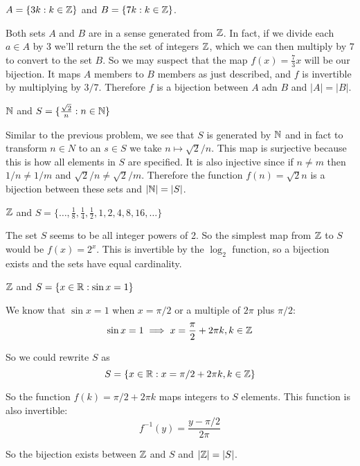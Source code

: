 \documentclass{article}
\begin{document}
\begin{problem}
$A = \{3k: k \in \mathbb{Z}\}$ and $B = \{7k : k \in \mathbb{Z}\}$.
\end{problem}

Both sets $A$ and $B$ are in a sense generated from $\mathbb{Z}$. In fact, if we divide each $a \in A$ by 3 we'll return the the set of integers $\mathbb{Z}$, which we can then multiply by $7$ to convert to the set $B$. So we may suspect that the map $f(x) = \frac{7}{3}x$ will be our bijection. It maps $A$ members to $B$ members as just described, and $f$ is invertible by multiplying by $3/7$. Therefore $f$ is a bijection between $A$ adn $B$ and $|A| = |B|$.

\begin{problem}
$\mathbb{N}$ and $S = \{\frac{\sqrt{2}}{n}: n \in \mathbb{N}\}$
\end{problem}

Similar to the previous problem, we see that $S$ is generated by $\mathbb{N}$ and in fact to transform $n \in N$ to an $s \in S$ we take $n \mapsto \sqrt{2}/n$. This map is surjective because this is how all elements in $S$ are specified. It is also injective since if $n \neq m$ then $1/n \neq 1/m$ and $\sqrt{2}/n \neq \sqrt{2}/m$. Therefore the function $f(n) = \sqrt{2}{n}$ is a bijection between these sets and $|\mathbb{N}| = |S|$.

\begin{problem}
$\mathbb{Z}$ and $S = \{\ldots, \frac{1}{8}, \frac{1}{4}, \frac{1}{2}, 1, 2, 4, 8, 16, \ldots\}$
\end{problem}

The set $S$ seems to be all integer powers of 2. So the simplest map from $\mathbb{Z}$ to $S$ would be $f(x) = 2^x$. This is invertible by the $\log_2$ function, so a bijection exists and the sets have equal cardinality.

\begin{problem}
$\mathbb{Z}$ and $S = \{x \in \mathbb{R}: \sin x = 1\}$
\end{problem}

We know that $\sin x = 1$ when $x = \pi/2$ or a multiple of $2\pi$ plus $\pi/2$:
$$\sin x = 1 \implies x = \frac{\pi}{2} + 2\pi k, k \in \mathbb{Z}$$

So we could rewrite $S$ as
$$S = \{x \in \mathbb{R}: x = \pi/2 + 2\pi k, k \in \mathbb{Z}\}$$

So the function $f(k) = \pi/2 + 2\pi k$ maps integers to $S$ elements. This function is also invertible:
$$f^{-1}(y) = \frac{y - \pi/2}{2\pi}$$

So the bijection exists between $\mathbb{Z}$ and $S$ and $|\mathbb{Z}| = |S|$.
\end{document}
